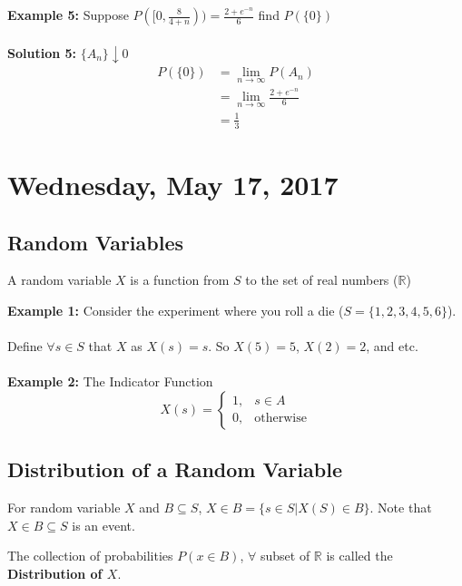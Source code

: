 \documentclass[12pt, twoside]{article}
\begin{document}
\textbf{Example 5:} Suppose $P([0,\frac{8}{4+n})) = \frac{2 + e^{-n}}{6}$ find $P(\{ 0 \})$\\\\
\textbf{Solution 5:} $\{A_n\}\downarrow 0$\\
\begin{align*}
	P(\{ 0 \}) &= \lim_{n\to\infty} P(A_n)\\
	&= \lim_{n\to\infty} \frac{2 + e^{-n}}{6}\\
	&= \frac{1}{3}
\end{align*}

\section{Wednesday, May 17, 2017}

\subsection{Random Variables}

\begin{tcolorbox}[title=Definition: Random Variables]
	A random variable $X$ is a function from $S$ to the set of real numbers ($\mathbb{R}$)
\end{tcolorbox}

\textbf{Example 1:} Consider the experiment where you roll a die ($S = \{ 1,2,3,4,5,6 \}$).\\
\\
Define $\forall s\in S$ that $X$ as $X(s) = s$. So $X(5) = 5$, $X(2) = 2$, and etc.
\\
\\
\textbf{Example 2:} The Indicator Function\\
$$X(s) =
\begin{cases}
	1, & s \in A\\
	0, & \text{otherwise}
\end{cases}
$$

\subsection{Distribution of a Random Variable}

\begin{tcolorbox}
	For random variable $X$ and $B \subseteq S$, $X \in B = \{ s \in S | X(S) \in B \}$. Note that $X \in B \subseteq S$ is an event.
\end{tcolorbox}

\begin{tcolorbox}[title=Definition: The Distribution of a Random Variable $X$]
	The collection of probabilities $P(x \in B)$, $\forall$ subset of $\mathbb{R}$ is called the \textbf{Distribution of $X$}.
\end{tcolorbox}
\end{document}
